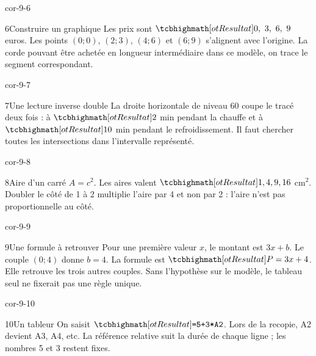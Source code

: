 \begin{blocLivre}{cor-9-6}\begin{corrige}{6}{Construire un graphique}
Les prix sont $\res{0,\ 3,\ 6,\ 9}$ euros. Les points $(0;0)$, $(2;3)$, $(4;6)$ et $(6;9)$ s’alignent avec l’origine. La corde pouvant être achetée en longueur intermédiaire dans ce modèle, on trace le segment correspondant.
\label{fig-cor-9-6}
\end{corrige}\end{blocLivre}
\begin{blocLivre}{cor-9-7}\begin{corrige}{7}{Une lecture inverse double}
La droite horizontale de niveau 60 coupe le tracé deux fois : à $\res2$ min pendant la chauffe et à $\res{10}$ min pendant le refroidissement. Il faut chercher toutes les intersections dans l’intervalle représenté.
\label{fig-cor-9-7}
\end{corrige}\end{blocLivre}
\begin{blocLivre}{cor-9-8}\begin{corrige}{8}{Aire d’un carré}
$A=c^2$. Les aires valent $\res{1,4,9,16}$ cm$^2$. Doubler le côté de 1 à 2 multiplie l’aire par 4 et non par 2 : l’aire n’est pas proportionnelle au côté.
\label{fig-cor-9-8}
\end{corrige}\end{blocLivre}
\begin{blocLivre}{cor-9-9}\begin{corrige}{9}{Une formule à retrouver}
Pour une première valeur $x$, le montant est $3x+b$. Le couple $(0;4)$ donne $b=4$. La formule est $\res{P=3x+4}$. Elle retrouve les trois autres couples. Sans l’hypothèse sur le modèle, le tableau seul ne fixerait pas une règle unique.
\end{corrige}\end{blocLivre}
\begin{blocLivre}{cor-9-10}\begin{corrige}{10}{Un tableur}
On saisit $\res{\texttt{=5+3*A2}}$. Lors de la recopie, A2 devient A3, A4, etc. La référence relative suit la durée de chaque ligne ; les nombres 5 et 3 restent fixes.
\label{fig-cor-9-10}
\end{corrige}\end{blocLivre}
